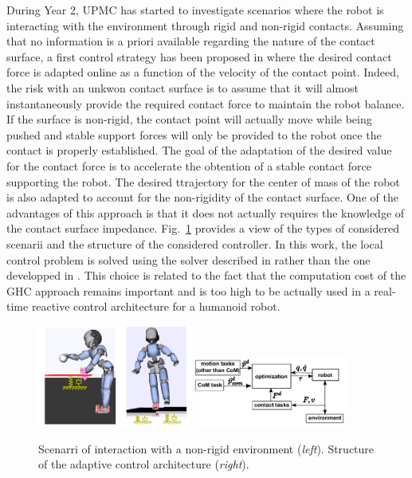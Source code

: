 During Year 2, UPMC has started to investigate scenarios where the robot is interacting with the environment through rigid and non-rigid contacts. Assuming that no information is a priori available regarding the nature of the contact surface, a first control strategy has been proposed in \cite{LiuIROS2015} where the desired contact force is adapted online as a function of the velocity of the contact point. Indeed, the risk with an unkwon contact surface is to assume that it will almost instantaneously provide the required contact force to maintain the robot balance. If the surface is non-rigid, the contact point will actually move while being pushed and stable support forces will only be provided to the robot once the contact is properly established. The goal of the adaptation of the desired value for the contact force is to accelerate the obtention of a stable contact force supporting the robot. The desired ttrajectory for the center of mass of the robot is also adapted to account for the non-rigidity of the contact surface. One of the advantages of this approach is that it does not actually requires the knowledge of the contact surface impedance. Fig.~\ref{fig:LIU_IROS_2015} provides a view of the types of considered scenarii and the structure of the considered controller. In this work, the local control problem is solved using the solver described in \cite{salini2012} rather than the one developped in \cite{LiuGHC}. This choice is related to the fact that the computation cost of the GHC approach remains important and is too high to be actually used in a real-time reactive control architecture for a humanoid robot.\\

\begin{figure}[h]
\centering
\includegraphics[width=0.45\textwidth]{images/LIU_IROS_2015} \includegraphics[width=0.45\textwidth]{images/LIU_IROS_2015_bis}
\caption{Scenarri of interaction with a non-rigid environment (\textit{left}). Structure of the adaptive control architecture (\textit{right}).}
\label{fig:LIU_IROS_2015}
\end{figure}

